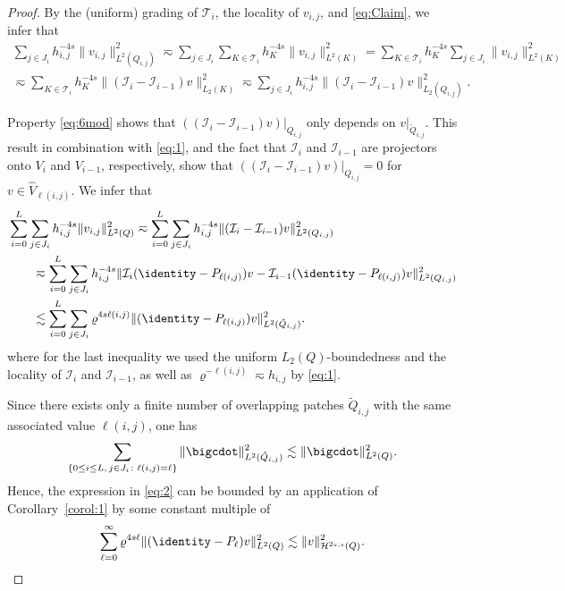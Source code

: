 \documentclass{amsart}
\providecommand{\tria}{\mathcal{T}}
\newcommand{\cH}{\mathcal H}
\begin{document}
\begin{proof}
By the (uniform) grading of $\tria_i$, the locality of $v_{i,j}$, and \eqref{eq:Claim}, we infer that
\begin{align*}
\sum_{j \in J_i} h_{i,j}^{-4s} \| v_{i,j}\|_{L^2(Q_{i,j})}^2 \eqsim 
\sum_{j \in J_i} \sum_{K \in \tria_i} h_K ^{-4s} \| v_{i,j}\|_{L^2(K)}^2 =
\sum_{K \in \tria_i} h_K ^{-4s} \sum_{j \in J_i}  \| v_{i,j}\|_{L^2(K)}^2\\
 \eqsim
\sum_{K \in \tria_i} h_K ^{-4s} \|(\mathcal{I}_i-\mathcal{I}_{i-1})v\|_{L_2(K)}^2 \eqsim
\sum_{j \in J_i} h_{i,j} ^{-4s} \|(\mathcal{I}_i-\mathcal{I}_{i-1})v\|_{L_2(Q_{i,j})}^2.
\end{align*}

Property \eqref{eq:6mod} shows that $((\mathcal{I}_i-\mathcal{I}_{i-1})v)|_{Q_{i,j}}$ only depends on $v|_{\tilde{Q}_{i,j}}$.
This result in combination with \eqref{eq:1}, and the fact that ${\mathcal I}_i$ and ${\mathcal I}_{i-1}$ are projectors onto $V_i$ and $V_{i-1}$, respectively, show that  $((\mathcal{I}_i-\mathcal{I}_{i-1})v)|_{Q_{i,j}}=0$ for $v \in \widehat{V}_{\ell(i,j)}$.
We infer that
\begin{align} \label{eq:2}
\begin{aligned}
&\sum_{i=0}^L \sum_{j \in J_i} h_{i,j}^{-4s}\|v_{i,j}\|^2_{L^2(Q)} \eqsim \sum_{i=0}^L \sum_{j \in J_i}  h_{i,j}^{-4s} \|(\mathcal{I}_i-\mathcal{I}_{i-1})v\|_{L^2(Q_{i,j})}^2\\  
&\qquad \eqsim \sum_{i=0}^L \sum_{j \in J_i}  h_{i,j}^{-4s} \|\mathcal{I}_i(\identity-P_{\ell(i,j)})v-\mathcal{I}_{i-1} (\identity-P_{\ell(i,j)})v\|_{L^2(Q_{i,j})}^2\\ 
&\qquad \lesssim \sum_{i=0}^L \sum_{j \in J_i}  \varrho^{4s \ell(i,j)} \|(\identity-P_{\ell(i,j)})v\|_{L^2(\tilde{Q}_{i,j})}^2.
\end{aligned}
\end{align}
where for the last inequality we used the uniform $L_2(Q)$-boundedness and the locality of ${\mathcal I}_i$ and ${\mathcal I}_{i-1}$, as well as $\varrho^{-\ell(i,j)} \eqsim h_{i,j}$ by \eqref{eq:1}.

Since there exists only a finite number of overlapping patches $\tilde{Q}_{i,j}$ with the same associated value $\ell(i,j)$, one has
\begin{equation*}
\sum_{\{0 \leq i \leq L,\,j\in J_i\colon \ell(i,j)=\ell\}} \|\bigcdot\|_{L^2(\tilde{Q}_{i,j})}^2 \lesssim \|\bigcdot\|_{L^2(Q)}^2.
\end{equation*}
Hence, the expression in \eqref{eq:2} can be bounded by an application of Corollary~\ref{corol:1} by some constant multiple of
\begin{equation*}
\sum_{\ell=0}^\infty \varrho^{ 4 s \ell}  \|(\identity-P_\ell)v\|_{L^2(Q)}^2 \lesssim \|v\|^2_{\cH^{2s,s}(Q)}.
\end{equation*}


\end{proof}
\end{document}
